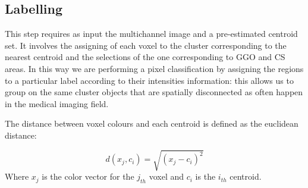 \documentclass{standalone}
\begin{document}
	\subsection*{Labelling}
	
	This step requires as input the multichannel image and a pre-estimated centroid set. It involves the assigning of each voxel to the cluster corresponding to the nearest centroid and the selections of the one corresponding to GGO and CS areas. In this way we are performing a pixel classification by assigning the regions to a particular label according to their intensities information: this allows us to group on the same cluster objects that are spatially disconnected as often happen in the medical imaging field.

	The distance between voxel colours and each centroid is defined as the euclidean distance:

	\begin{equation*}
		d(x_j, c_i) = \sqrt{(x_j - c_i)^2}
	\end{equation*} 
	Where $x_j$ is the color vector for the $j_{th}$ voxel and $c_i$ is the $i_{th}$ centroid.
	
	
\end{document}
